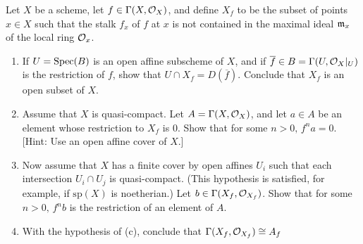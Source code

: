 \begin{ex}
	Let $X$ be a scheme, let $f \in \Gamma(X, \mathcal{O}_X)$, and define $X_f$ to be the subset of points $x \in X$ such that the stalk $f_x$ of $f$ at $x$ is not contained in the maximal ideal $\mathfrak{m}_x$ of the local ring $\mathcal{O}_x$.
	\begin{enumerate}[label=\alph*)]
		\item If $U = \mathrm{Spec}(B)$ is an open affine subscheme of $X$, and if $\overline{f} \in B = \Gamma(U, \mathcal{O}_X|_U)$ is the restriction of $f$, show that $U \cap X_f = D(\overline{f})$. Conclude that $X_f$ is an open subset of $X$.

		\item Assume that $X$ is quasi-compact. Let $A = \Gamma(X, \mathcal{O}_X)$, and let $a \in A$ be an element whose restriction to $X_f$ is $0$. Show that for some $n > 0, \, f^n a = 0$. [Hint: Use an open affine cover of $X$.]

		\item Now assume that $X$ has a finite cover by open affines $U_i$ such that each intersection $U_i \cap U_j$ is quasi-compact. (This hypothesis is satisfied, for example, if $\mathrm{sp}(X)$ is noetherian.) Let $b \in \Gamma(X_f, \mathcal{O}_{X_f})$. Show that for some $n > 0, \, f^n b$ is the restriction of an element of $A$.

		\item With the hypothesis of (c), conclude that $\Gamma(X_f, \mathcal{O}_{X_f}) \cong A_f$
	\end{enumerate}
\end{ex}

